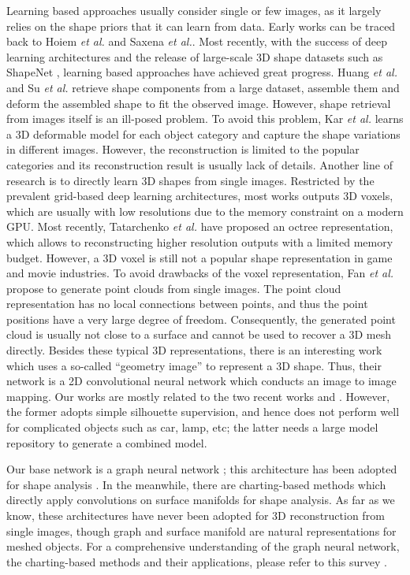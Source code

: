 \documentclass[runningheads]{llncs}
\def\etal{\emph{et al.}}
\begin{document}
Learning based approaches usually consider single or few images, as it largely relies on the shape priors that it can learn from data. Early works can be traced back to Hoiem \etal \cite{HoiemEH07} and Saxena \etal \cite{SaxenaSN09}. Most recently, with the success of deep learning architectures and the release of large-scale 3D shape datasets such as ShapeNet \cite{ChangFGHHLSSSSX15}, learning based approaches have achieved great progress. Huang \etal \cite{HuangWK15} and Su \etal \cite{SuHMLG14} retrieve shape components from a large dataset, assemble them and deform the assembled shape to fit the observed image. However, shape retrieval from images itself is an ill-posed problem. To avoid this problem, Kar \etal \cite{KarTCM15} learns a 3D deformable model for each object category and capture the shape variations in different images. However, the reconstruction is limited to the popular categories and its reconstruction result is usually lack of details.
Another line of research is to directly learn 3D shapes from single images. Restricted by the prevalent grid-based deep learning architectures, most works \cite{ChoyXGCS16,GirdharFRG16} outputs 3D voxels, which are usually with low resolutions due to the memory constraint on a modern GPU. Most recently, Tatarchenko \etal \cite{TatarchenkoDB17} have proposed an octree representation, which allows to reconstructing higher resolution outputs with a limited memory budget. However, a 3D voxel is still not a popular shape representation in game and movie industries.
To avoid drawbacks of the voxel representation, Fan \etal \cite{FanSG16} propose to generate point clouds from single images. The point cloud representation has no local connections between points, and thus the point positions have a very large degree of freedom. Consequently, the generated point cloud is usually not close to a surface and cannot be used to recover a 3D mesh directly.
Besides these typical 3D representations, there is an interesting work \cite{SinhaUHR17} which uses a so-called ``geometry image'' to represent a 3D shape. Thus, their network is a 2D convolutional neural network which conducts an image to image mapping. Our works are mostly related to the two recent works \cite{KatoUH2018} and \cite{PontesKSLF2017}. However, the former adopts simple silhouette supervision, and hence does not perform well for complicated objects such as car, lamp, etc; the latter needs a large model repository to generate a combined model.

Our base network is a graph neural network \cite{ScarselliGTHM09}; this architecture has been adopted for shape analysis \cite{YiSGG16}. In the meanwhile, there are charting-based methods which directly apply convolutions on surface manifolds \cite{BoscainiMRB16,MasciBBV15,MontiBMRSB17} for shape analysis.
As far as we know, these architectures have never been adopted for 3D reconstruction from single images, though graph and surface manifold are natural representations for meshed objects. For a comprehensive understanding of the graph neural network, the charting-based methods and their applications, please refer to this survey \cite{BronsteinBLSV17}.
 
\end{document}

